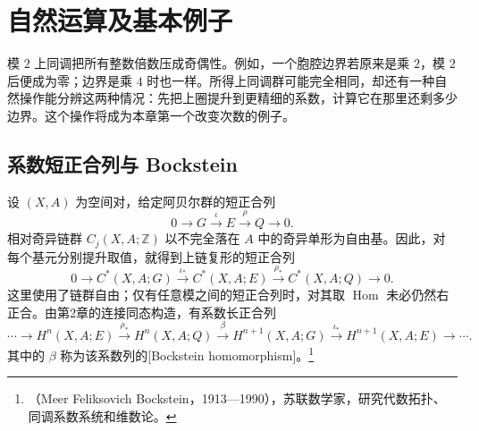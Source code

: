 
% 
% 

\section{自然运算及基本例子}
\label{g2:sec:1301}

模 \(2\) 上同调把所有整数倍数压成奇偶性。例如，一个胞腔边界若原来是乘 \(2\)，模 \(2\) 后便成为零；边界是乘 \(4\) 时也一样。所得上同调群可能完全相同，却还有一种自然操作能分辨这两种情况：先把上圈提升到更精细的系数，计算它在那里还剩多少边界。这个操作将成为本章第一个改变次数的例子。

\subsection{系数短正合列与 Bockstein}
\label{g2:subsec:1301:01}

设 \((X,A)\) 为空间对，给定阿贝尔群的短正合列
\begin{equation}\label{g2:eq:coefficient-short-exact}
	0\longrightarrow G\xrightarrow{\iota}E\xrightarrow{\rho}Q\longrightarrow0.
\end{equation}
相对奇异链群 \(C_j(X,A;\mathbb Z)\) 以不完全落在 \(A\) 中的奇异单形为自由基。因此，对每个基元分别提升取值，就得到上链复形的短正合列
\[
	0\longrightarrow C^*(X,A;G)\xrightarrow{\iota_*}C^*(X,A;E)\xrightarrow{\rho_*}C^*(X,A;Q)\longrightarrow0.
\]
这里使用了链群自由；仅有任意模之间的短正合列时，对其取 \(\operatorname{Hom}\) 未必仍然右正合。由第2章的连接同态构造，有系数长正合列
\[
	\cdots\longrightarrow H^n(X,A;E)\xrightarrow{\rho_*}H^n(X,A;Q)\xrightarrow{\beta}H^{n+1}(X,A;G)\xrightarrow{\iota_*}H^{n+1}(X,A;E)\longrightarrow\cdots.
\]
其中的 \(\beta\) 称为该系数列的[Bockstein homomorphism]。\footnote{（Meer Feliksovich Bockstein，1913—1990），苏联数学家，研究代数拓扑、同调系数系统和维数论。}

